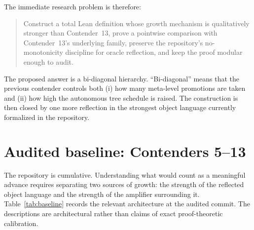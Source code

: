 \documentclass[11pt]{article}
\theoremstyle{definition}
\theoremstyle{remark}
\begin{document}
The immediate research problem is therefore:
\begin{quote}
Construct a total Lean definition whose growth mechanism is qualitatively
stronger than Contender~13, prove a pointwise comparison with Contender~13's
underlying family, preserve the repository's no-monotonicity discipline for
oracle reflection, and keep the proof modular enough to audit.
\end{quote}

The proposed answer is a bi-diagonal hierarchy.  ``Bi-diagonal'' means that the
previous contender controls both (i) how many meta-level promotions are taken
and (ii) how high the autonomous tree schedule is raised.  The construction is
then closed by one more reflection in the strongest object language currently
formalized in the repository.

\section{Audited baseline: Contenders 5--13}

The repository is cumulative.  Understanding what would count as a meaningful
advance requires separating two sources of growth: the strength of the
reflected object language and the strength of the amplifier surrounding it.
Table~\ref{tab:baseline} records the relevant architecture at the audited
commit.  The descriptions are architectural rather than claims of exact
proof-theoretic calibration.
\end{document}
